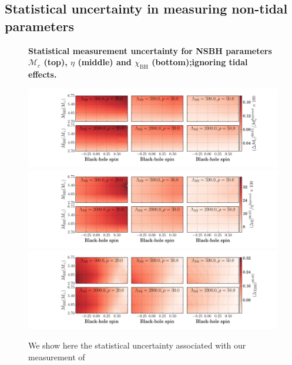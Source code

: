 \documentclass[aps,prd,amsmath,floats,floatfix, twocolumn,
superscriptaddress,nofootinbib,showpacs]{revtex4-1}
\newcommand{\chibh}{\chi_\mathrm{BH}}
\newcommand{\mchirp}{\mathcal{M}_c}
\begin{document}
\begin{appendix}

\section{Statistical uncertainty in measuring non-tidal parameters}\label{as1:nontidalerrors}
% 
\begin{figure}
\centering 
\textbf{Statistical measurement uncertainty for NSBH parameters $\mchirp$ (top),
$\eta$ (middle) and $\chibh$ (bottom);\newline ignoring tidal effects.}\par\medskip
\includegraphics[trim = {2cm 0 0 0},width=2.\columnwidth]{plots/TNMchirpCIWidths90_0_Lambda_SNR}\\
\includegraphics[trim = {2cm 0 0 0},width=2.\columnwidth]{plots/TNEtaCIWidths90_0_Lambda_SNR}\\
\includegraphics[trim = {2cm 0 0 0},width=2.\columnwidth]{plots/TNChiBHCIWidths90_0_Lambda_SNR}
\caption{
We show here the statistical uncertainty associated with our measurement of
}
\end{figure}
\end{appendix}
\end{document}

